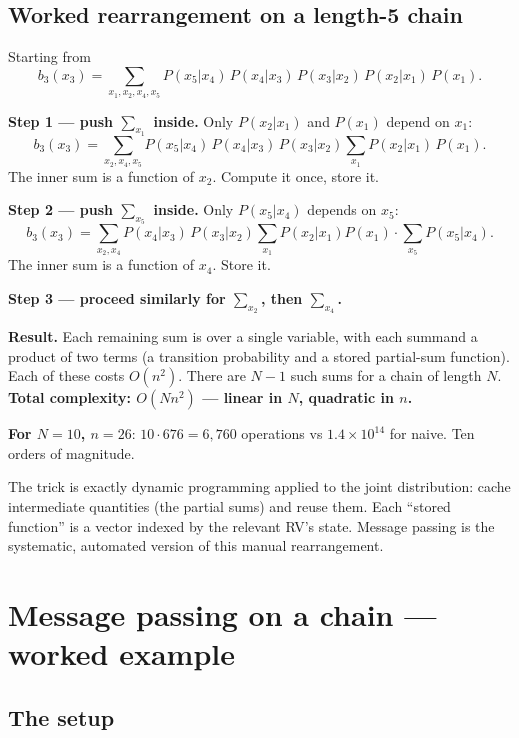 \documentclass[11pt, a4paper]{article}
\begin{document}
\subsection{Worked rearrangement on a length-5 chain}

Starting from
\[
b_3(x_3) = \sum_{x_1, x_2, x_4, x_5} P(x_5|x_4)\,P(x_4|x_3)\,P(x_3|x_2)\,P(x_2|x_1)\,P(x_1).
\]

\textbf{Step 1 — push $\sum_{x_1}$ inside.} Only $P(x_2|x_1)$ and $P(x_1)$ depend on $x_1$:
\[
b_3(x_3) = \sum_{x_2, x_4, x_5} P(x_5|x_4)\,P(x_4|x_3)\,P(x_3|x_2)\sum_{x_1} P(x_2|x_1)\,P(x_1).
\]
The inner sum is a function of $x_2$. Compute it once, store it.

\textbf{Step 2 — push $\sum_{x_5}$ inside.} Only $P(x_5|x_4)$ depends on $x_5$:
\[
b_3(x_3) = \sum_{x_2, x_4} P(x_4|x_3)\,P(x_3|x_2)\sum_{x_1}P(x_2|x_1)P(x_1) \cdot \sum_{x_5}P(x_5|x_4).
\]
The inner sum is a function of $x_4$. Store it.

\textbf{Step 3 — proceed similarly for $\sum_{x_2}$, then $\sum_{x_4}$.}

\textbf{Result.} Each remaining sum is over a single variable, with each summand a product of two terms (a transition probability and a stored partial-sum function). Each of these costs $O(n^2)$. There are $N-1$ such sums for a chain of length $N$. \textbf{Total complexity: $O(Nn^2)$ — linear in $N$, quadratic in $n$.}

\textbf{For $N = 10$, $n = 26$}: $10 \cdot 676 = 6{,}760$ operations vs $1.4\times 10^{14}$ for naive. Ten orders of magnitude.

\begin{notebox}
The trick is exactly dynamic programming applied to the joint distribution: cache intermediate quantities (the partial sums) and reuse them. Each ``stored function'' is a vector indexed by the relevant RV's state. Message passing is the systematic, automated version of this manual rearrangement.
\end{notebox}

\section{Message passing on a chain --- worked example}

\subsection{The setup}
\end{document}
